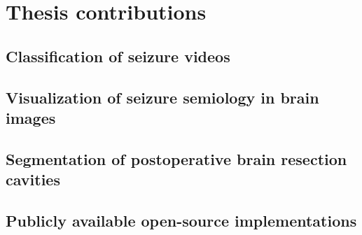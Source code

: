 \section{Thesis contributions}







\subsection{Classification of seizure videos}

\subsection{Visualization of seizure semiology in brain images}

\subsection{Segmentation of postoperative brain resection cavities}

\subsection{Publicly available open-source implementations}
